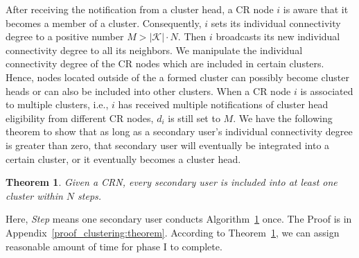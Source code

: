 \documentclass[10pt,journal,compsoc]{IEEEtran}
\makeatletter
\theoremstyle{mytheoremstyle}
\newtheorem{theorem}{Theorem}[section]
\theoremstyle{mytheoremstyle}
\theoremstyle{mytheoremstyle}
\renewenvironment{proof}[1][\proofname]{%
      \par\pushQED{\qed}\fontfamily{ptm}\selectfont%
      \topsep6\p@\@plus6\p@\relax
      \trivlist\item[\hskip\labelsep\bfseries#1\@addpunct{.}]%
      \ignorespaces
    }{%
      \popQED\endtrivlist\@endpefalse
    }
\newcommand{\ie}{i.e., }
\makeatother
\begin{document}
After receiving the notification from a cluster head, a CR node $i$ is aware that it becomes a member of a cluster. Consequently, $i$ sets its individual connectivity degree to a positive number $M > |\mathcal{K}| \cdot N$. %
Then $i$ broadcasts its new individual connectivity degree to all its neighbors. 
We manipulate the individual connectivity degree of the CR nodes which are included in certain clusters. Hence, nodes located outside of the a formed cluster can possibly become cluster heads or can also be included into other clusters.
When a CR node $i$ is associated to multiple clusters, \ie $i$ has received multiple notifications of cluster head eligibility from different CR nodes, $d_i$ is still set to $M$.
We have the following theorem to show that as long as a secondary user's individual connectivity degree is greater than zero, that secondary user will eventually be integrated into a certain cluster, or it eventually becomes a cluster head.
\begin{theorem}
\label{clustering:theorem}
Given a CRN, every secondary user is included into at least one cluster within $N$ steps.
\end{theorem}
Here, \textit{Step} means one secondary user conducts Algorithm~\ref{clustering:theorem} once.
The Proof is in Appendix~\ref{proof_clustering:theorem}.
According to Theorem~\ref{clustering:theorem}, we can assign reasonable amount of time for phase I to complete.
\end{document}
